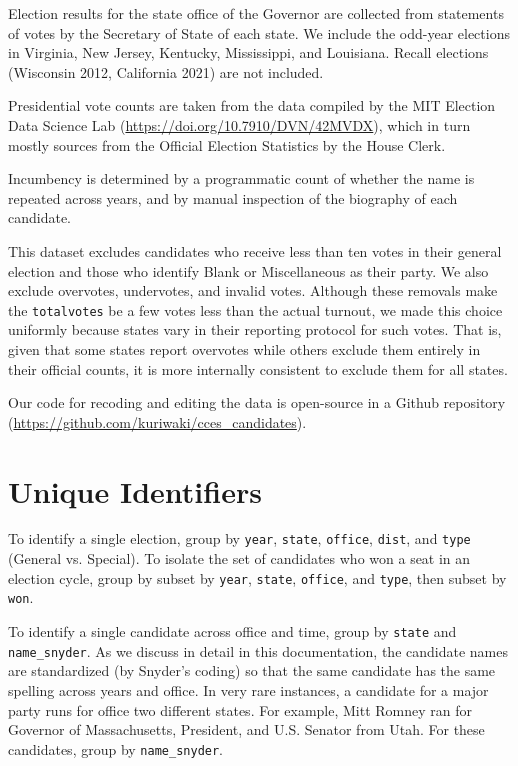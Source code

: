 \documentclass[12pt]{article}
\begin{document}
Election results for the state office of the Governor are collected from statements of votes by the Secretary of State of each state. We include the odd-year elections in Virginia, New Jersey, Kentucky, Mississippi, and Louisiana.
Recall elections (Wisconsin 2012, California 2021) are not included.

Presidential vote counts are taken from the data compiled by the MIT Election Data Science Lab (\url{https://doi.org/10.7910/DVN/42MVDX}), which in turn mostly sources from the Official Election Statistics by the House Clerk.

Incumbency is determined by a programmatic count of whether the name is repeated across years, and by manual inspection of the biography of each candidate.

This dataset excludes candidates who receive less than ten votes in their general election and those who identify Blank or Miscellaneous as their party.
We also exclude overvotes, undervotes, and invalid votes.
Although these removals make the \texttt{totalvotes} be a few votes less than the actual turnout, we made this choice uniformly because states vary in their reporting protocol for such votes. That is, given that some states report overvotes while others exclude them entirely in their official counts, it is more internally consistent to exclude them for all states.

Our code for recoding and editing the data is open-source in a Github repository (\url{https://github.com/kuriwaki/cces_candidates}).


\section{Unique Identifiers}

To identify a single election, group by \texttt{year}, \texttt{state}, \texttt{office}, \texttt{dist}, and \texttt{type} (General vs. Special).  To isolate the set of candidates who won a seat in an election cycle, group by subset by \texttt{year}, \texttt{state}, \texttt{office}, and \texttt{type}, then subset by \texttt{won}.

To identify a single candidate across office and time, group by \texttt{state} and  \texttt{name\_snyder}.
As we discuss in detail in this documentation, the candidate names are standardized (by Snyder's coding) so that the same candidate has the same spelling across years and office.
In very rare instances, a candidate for a major party runs for office two different states. For example, Mitt Romney ran for Governor of Massachusetts, President, and U.S. Senator from Utah. For these candidates, group by \texttt{name\_snyder}.
\end{document}
